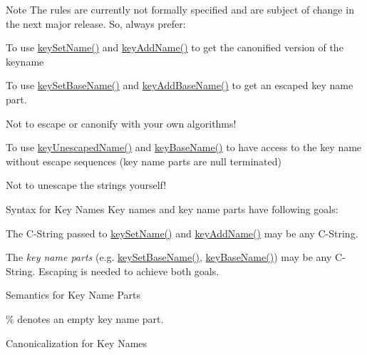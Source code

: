 \begin{DoxyItemize}
\begin{DoxyNote}{Note}
The rules are currently not formally specified and are subject of change in the next major release. So, always prefer\+:
\begin{DoxyItemize}
\item To use \mbox{\hyperlink{group__keyname_ga7699091610e7f3f43d2949514a4b35d9}{key\+Set\+Name()}} and \mbox{\hyperlink{group__keyname_gaa70593a2c772c4b7bc33423b9b10a270}{key\+Add\+Name()}} to get the canonified version of the keyname
\item To use \mbox{\hyperlink{group__keyname_ga6e804bd453f98c28b0ff51430d1df407}{key\+Set\+Base\+Name()}} and \mbox{\hyperlink{group__keyname_gaa942091fc4bd5c2699e49ddc50829524}{key\+Add\+Base\+Name()}} to get an escaped key name part.
\item Not to escape or canonify with your own algorithms!
\item To use \mbox{\hyperlink{group__keyname_ga6fe6af4c27b35d911a533f4ae4d698bb}{key\+Unescaped\+Name()}} and \mbox{\hyperlink{group__keyname_gaaff35e7ca8af5560c47e662ceb9465f5}{key\+Base\+Name()}} to have access to the key name without escape sequences (key name parts are null terminated)
\item Not to unescape the strings yourself!
\end{DoxyItemize}
\end{DoxyNote}
\begin{DoxyParagraph}{Syntax for Key Names}
Key names and key name parts have following goals\+:
\begin{DoxyItemize}
\item The C-\/\+String passed to \mbox{\hyperlink{group__keyname_ga7699091610e7f3f43d2949514a4b35d9}{key\+Set\+Name()}} and \mbox{\hyperlink{group__keyname_gaa70593a2c772c4b7bc33423b9b10a270}{key\+Add\+Name()}} may be any C-\/\+String.
\item The {\itshape key name parts} (e.\+g. \mbox{\hyperlink{group__keyname_ga6e804bd453f98c28b0ff51430d1df407}{key\+Set\+Base\+Name()}}, \mbox{\hyperlink{group__keyname_gaaff35e7ca8af5560c47e662ceb9465f5}{key\+Base\+Name()}}) may be any C-\/\+String. Escaping is needed to achieve both goals.
\end{DoxyItemize}
\end{DoxyParagraph}
\begin{DoxyParagraph}{Semantics for Key Name Parts}

\begin{DoxyItemize}
\item \% denotes an empty key name part.
\end{DoxyItemize}
\end{DoxyParagraph}
\begin{DoxyParagraph}{Canonicalization for Key Names}


\end{DoxyParagraph}
\end{DoxyItemize}
